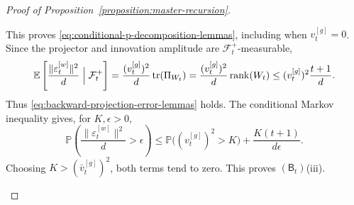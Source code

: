 \begin{proof}[Proof of Proposition~\ref{proposition:master-recursion}]
\begin{enumerate}[wide]
\begin{enumerate}[label=(\alph*),wide]
\[        \]
        This proves
        \eqref{eq:conditional-p-decomposition-lemmas},
        including when $v_t^{[g]}=0$.
        Since the projector and innovation amplitude are
        $\mathcal F_t^+$-measurable,
        \[
        \begin{aligned}
            \mathbb E\left[
                \frac{\|\varepsilon_t^{[w]}\|^2}{d}
                \Bigm|\mathcal F_t^+
            \right]
            =
            \frac{(v_t^{[g]})^2}{d}
            \operatorname{tr}(\Pi_{W_t})
            =
            \frac{(v_t^{[g]})^2}{d}
            \operatorname{rank}(W_t)
            \leq
            (v_t^{[g]})^2\frac{t+1}{d}.
        \end{aligned}
        \]
        Thus \eqref{eq:backward-projection-error-lemmas} holds. The
        conditional Markov inequality gives, for
        $K,\epsilon>0$,
        \[
            \mathbb P\left(
                \frac{\|\varepsilon_t^{[w]}\|^2}{d}
                >\epsilon
            \right)
            \leq
            \mathbb P\bigl((v_t^{[g]})^2>K\bigr)
            +
            \frac{K(t+1)}{d\epsilon}.
        \]
        Choosing $K>(\bar v_t^{[g]})^2$, both terms tend
        to zero. This proves $(\mathsf B_t)$(iii).
    

\end{enumerate}
\end{enumerate}
\end{proof}
